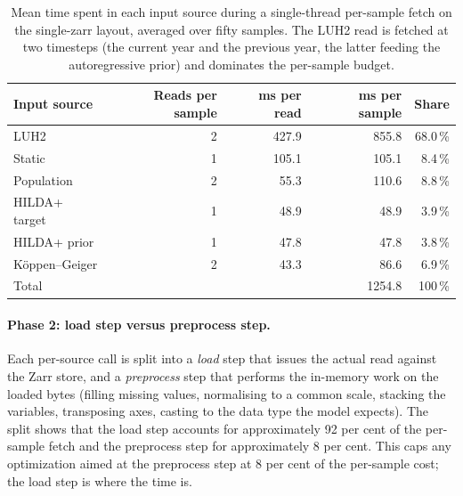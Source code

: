 \documentclass[12pt,a4paper]{article}
\begin{document}
\begin{table}[ht]
\centering
\small
\begin{tabular}{@{}lrrrr@{}}
\toprule
\textbf{Input source} & \textbf{Reads per sample} & \textbf{ms per read} & \textbf{ms per sample} & \textbf{Share} \\
\midrule
LUH2                & 2 & 427.9 & 855.8  & 68.0\,\% \\
Static              & 1 & 105.1 & 105.1  &  8.4\,\% \\
Population          & 2 &  55.3 & 110.6  &  8.8\,\% \\
HILDA+ target       & 1 &  48.9 &  48.9  &  3.9\,\% \\
HILDA+ prior        & 1 &  47.8 &  47.8  &  3.8\,\% \\
K\"{o}ppen--Geiger  & 2 &  43.3 &  86.6  &  6.9\,\% \\
\midrule
Total               &   &       & 1254.8 & 100\,\% \\
\bottomrule
\end{tabular}
\caption{Mean time spent in each input source during a single-thread per-sample fetch on
the single-zarr layout, averaged over fifty samples. The LUH2 read is fetched at two
timesteps (the current year and the previous year, the latter feeding the autoregressive
prior) and dominates the per-sample budget.}
\label{tab:per-source}
\end{table}

\paragraph{Phase 2: load step versus preprocess step.} Each per-source call is split into
a \emph{load} step that issues the actual read against the Zarr store, and a
\emph{preprocess} step that performs the in-memory work on the loaded bytes (filling missing
values, normalising to a common scale, stacking the variables, transposing axes, casting to
the data type the model expects). The split shows that the load step accounts for
approximately 92 per cent of the per-sample fetch and the preprocess step for approximately
8 per cent. This caps any optimization aimed at the preprocess step at 8 per cent of the
per-sample cost; the load step is where the time is.
\end{document}
